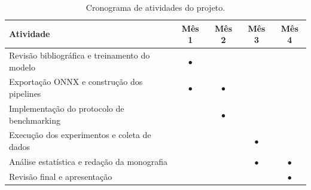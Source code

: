 \documentclass[12pt,a4paper]{article}
\begin{document}
\begin{table}[H]
\centering
\caption{Cronograma de atividades do projeto.}
\label{tab:cronograma}
\renewcommand{\arraystretch}{1.3}
\begin{tabularx}{\textwidth}{|X|c|c|c|c|}
\hline
\textbf{Atividade} & \textbf{Mês 1} & \textbf{Mês 2} & \textbf{Mês 3} & \textbf{Mês 4} \\
\hline
Revisão bibliográfica e treinamento do modelo
  & $\bullet$ & & & \\
\hline
Exportação ONNX e construção dos pipelines
  & $\bullet$ & $\bullet$ & & \\
\hline
Implementação do protocolo de benchmarking
  & & $\bullet$ & & \\
\hline
Execução dos experimentos e coleta de dados
  & & & $\bullet$ & \\
\hline
Análise estatística e redação da monografia
  & & & $\bullet$ & $\bullet$ \\
\hline
Revisão final e apresentação
  & & & & $\bullet$ \\
\hline
\end{tabularx}
\end{table}

\newpage
\printbibliography[title={Referências}]
\end{document}

